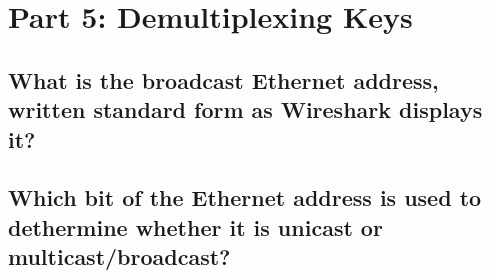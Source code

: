 \documentclass{article}
\begin{document}
    \section*{Part 5: Demultiplexing Keys}
    \subsection{What is the broadcast Ethernet address, written standard form as Wireshark displays it?}

    \subsection{Which bit of the Ethernet address is used to dethermine whether it is unicast or multicast/broadcast?}
\end{document}
